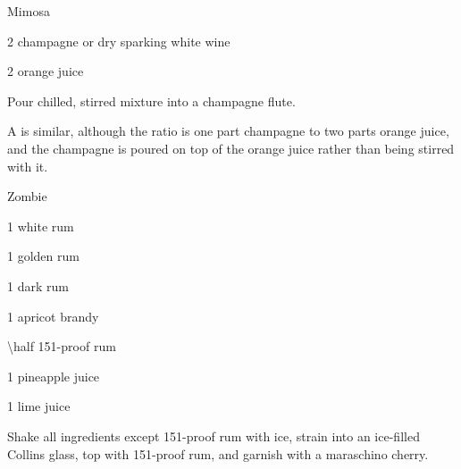 \begin{Cocktail}{Mimosa}
	\begin{Ingredients}
	\item \SI{2}{\oz} champagne or dry sparking white wine
	\item \SI{2}{\oz} orange juice
	\end{Ingredients}
	
	\begin{Instructions}
	Pour chilled, stirred mixture into a champagne flute.
	
	A  is similar, although the ratio is one part champagne to two parts orange juice, and the champagne is poured on top of the orange juice rather than being stirred with it.
	\end{Instructions}
\end{Cocktail}

%	

\begin{Cocktail}{Zombie}
	\begin{Ingredients}
	\item \SI{1}{\oz} white rum
	\item \SI{1}{\oz} golden rum
	\item \SI{1}{\oz} dark rum
	\item \SI{1}{\oz} apricot brandy
	\item \SI{\half}{\oz} 151-proof rum
	\item \SI{1}{\oz} pineapple juice
	\item \SI{1}{\oz} lime juice
	\end{Ingredients}
	
	\begin{Instructions}
	Shake all ingredients except 151-proof rum with ice, strain into an ice-filled Collins glass, top with 151-proof rum, and garnish with a maraschino cherry.
	\end{Instructions}
\end{Cocktail}

